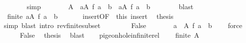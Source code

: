 \begin{isabellebody}
\ \ \ \ \ \ \isamarkupfalse%
\ simp\isanewline
\ \ \ \ \isamarkupfalse%
\ \isamarkupfalse%
\ {\isachardoublequoteopen}A\ {\isacharminus}{\kern0pt}\ {\isacharbraceleft}{\kern0pt}a{\isasymin}A{\isachardot}{\kern0pt}\ f\ a\ {\isacharequal}{\kern0pt}\ b{\isacharbraceright}{\kern0pt}\ {\isacharequal}{\kern0pt}\ {\isacharbraceleft}{\kern0pt}a{\isasymin}A{\isachardot}{\kern0pt}\ f\ a\ {\isasymnoteq}\ b{\isacharbraceright}{\kern0pt}{\isachardoublequoteclose}\isanewline
\ \ \ \ \ \ \isamarkupfalse%
\ blast\isanewline
\ \ \ \ \isamarkupfalse%
\ \isamarkupfalse%
\ {\isachardoublequoteopen}{\isasymnot}\ finite\ {\isacharbraceleft}{\kern0pt}a{\isasymin}A{\isachardot}{\kern0pt}\ f\ a\ {\isasymnoteq}\ b{\isacharbraceright}{\kern0pt}{\isachardoublequoteclose}\ \isacommand{{\isachardot}{\kern0pt}}\isamarkupfalse%
\isanewline
\ \ \ \ \isamarkupfalse%
\ insert{\isacharparenleft}{\kern0pt}{}{\isacharparenright}{\kern0pt}{\isacharbrackleft}{\kern0pt}OF\ {\isacharunderscore}{\kern0pt}\ this{\isacharbrackright}{\kern0pt}\ insert{\isacharparenleft}{\kern0pt}{}{\isacharcomma}{\kern0pt}{}{\isacharparenright}{\kern0pt}\ \isamarkupfalse%
\ {\isacharquery}{\kern0pt}thesis\isanewline
\ \ \ \ \ \ \isamarkupfalse%
\ simp\ {\isacharparenleft}{\kern0pt}blast\ intro{\isacharcolon}{\kern0pt}\ rev{\isacharunderscore}{\kern0pt}finite{\isacharunderscore}{\kern0pt}subset{\isacharparenright}{\kern0pt}\isanewline
\ \ \isamarkupfalse%
\isanewline
\ \ \ \ \isamarkupfalse%
\ False\isanewline
\ \ \ \ \isamarkupfalse%
\ \isamarkupfalse%
\ {\isachardoublequoteopen}{\isacharbraceleft}{\kern0pt}a\ {\isasymin}\ A{\isachardot}{\kern0pt}\ f\ a\ {\isacharequal}{\kern0pt}\ b{\isacharbraceright}{\kern0pt}\ {\isasymnoteq}\ {\isacharbraceleft}{\kern0pt}{\isacharbraceright}{\kern0pt}{\isachardoublequoteclose}\ \isamarkupfalse%
\ force\isanewline
\ \ \ \ \isamarkupfalse%
\ False\ \isamarkupfalse%
\ {\isacharquery}{\kern0pt}thesis\ \isamarkupfalse%
\ blast\isanewline
\ \ \isamarkupfalse%
\isanewline
{}\isamarkupfalse%
%
\endisatagproof
{\isafoldproof}%
%
\isadelimproof
\isanewline
%
\endisadelimproof
\isanewline
{}\isamarkupfalse%
\ pigeonhole{\isacharunderscore}{\kern0pt}infinite{\isacharunderscore}{\kern0pt}rel{\isacharcolon}{\kern0pt}\isanewline
\ \ \ {\isachardoublequoteopen}{\isasymnot}\ finite\ A{\isachardoublequoteclose}\isanewline

\end{isabellebody}
